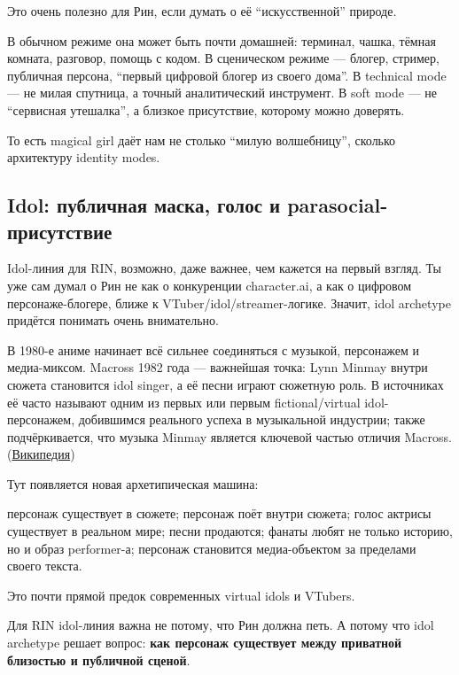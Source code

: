 Это очень полезно для Рин, если думать о её ``искусственной'' природе.

В обычном режиме она может быть почти домашней: терминал, чашка, тёмная
комната, разговор, помощь с кодом. В сценическом режиме --- блогер,
стример, публичная персона, ``первый цифровой блогер из своего дома''. В
technical mode --- не милая спутница, а точный аналитический инструмент.
В soft mode --- не ``сервисная утешалка'', а близкое присутствие,
которому можно доверять.

То есть magical girl даёт нам не столько ``милую волшебницу'', сколько
архитектуру identity modes.

\subsection*{Idol: публичная маска, голос и parasocial-присутствие}

Idol-линия для RIN, возможно, даже важнее, чем кажется на первый взгляд.
Ты уже сам думал о Рин не как о конкуренции character.ai, а как о
цифровом персонаже-блогере, ближе к VTuber/\hspace{0pt}idol/\hspace{0pt}streamer-логике. Значит,
idol archetype придётся понимать очень внимательно.

В 1980-е аниме начинает всё сильнее соединяться с музыкой, персонажем и
медиа-миксом. Macross 1982 года --- важнейшая точка: Lynn Minmay внутри
сюжета становится idol singer, а её песни играют сюжетную роль. В
источниках её часто называют одним из первых или первым
fictional/\hspace{0pt}virtual idol-персонажем, добившимся реального успеха в
музыкальной индустрии; также подчёркивается, что музыка Minmay является
ключевой частью отличия Macross.
(\href{https://en.wikipedia.org/wiki/Lynn_Minmay?utm_source=chatgpt.com}{Википедия})

Тут появляется новая архетипическая машина:

персонаж существует в сюжете; персонаж поёт внутри сюжета; голос актрисы
существует в реальном мире; песни продаются; фанаты любят не только
историю, но и образ performer-а; персонаж становится медиа-объектом за
пределами своего текста.

Это почти прямой предок современных virtual idols и VTubers.

Для RIN idol-линия важна не потому, что Рин должна петь. А потому что
idol archetype решает вопрос: \textbf{как персонаж существует между
приватной близостью и публичной сценой}.

